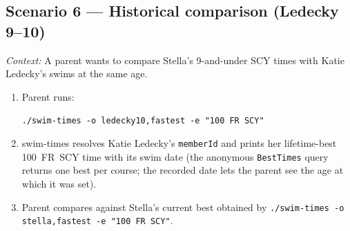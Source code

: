 \documentclass[12pt]{article}
\newcommand{\code}[1]{\texttt{#1}}
\begin{document}

\subsection{Scenario 6 --- Historical comparison (Ledecky 9--10)}

\textit{Context:} A parent wants to compare Stella's 9-and-under
SCY times with Katie Ledecky's swims at the same age.

\begin{enumerate}
  \item Parent runs:
        \begin{center}
          \code{./swim-times -o ledecky10,fastest -e "100 FR SCY"}
        \end{center}
  \item swim-times resolves Katie Ledecky's \code{memberId} and
        prints her lifetime-best 100~FR~SCY time with its swim date
        (the anonymous \code{BestTimes} query returns one best per
        course; the recorded date lets the parent see the age at
        which it was set).
  \item Parent compares against Stella's current best obtained by
        \code{./swim-times -o stella,fastest -e "100 FR SCY"}.
\end{enumerate}

\end{document}
